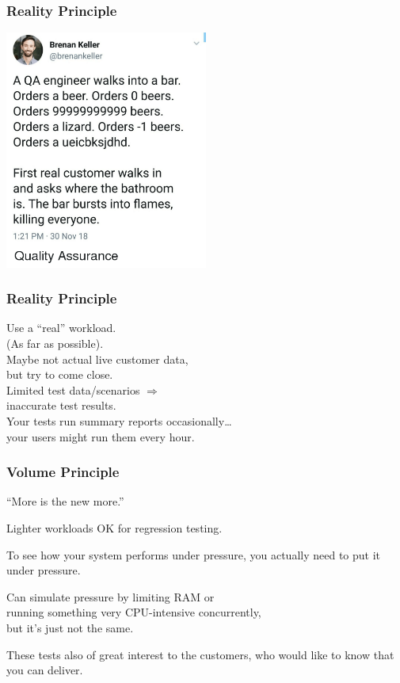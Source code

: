\begin{frame}
\frametitle{Reality Principle}

\begin{center}
	\includegraphics[width=0.5\textwidth]{images/qa.png}
\end{center}


\end{frame}


\begin{frame}
\frametitle{Reality Principle}

\begin{changemargin}{2cm}
Use a ``real'' workload.\\
(As far as possible).\\[1em]
Maybe not actual live customer data,\\
but try to come close.\\[1em]
Limited test data/scenarios $\Rightarrow$ \\
\qquad inaccurate test results.\\[1em]
Your tests run summary reports occasionally\ldots\\
your users might run them every hour. 
\end{changemargin}
\end{frame}



\begin{frame}
\frametitle{Volume Principle}

\begin{changemargin}{2cm}
``More is the new more.'' 

Lighter workloads OK for regression testing. 

To see how your system performs under pressure, you actually need to put it under pressure. 

Can simulate pressure by limiting RAM or\\ running something very CPU-intensive concurrently,\\
but it's just not the same.

These tests also  of great interest to the customers, who would like to know that you can deliver. 
\end{changemargin}

\end{frame}




